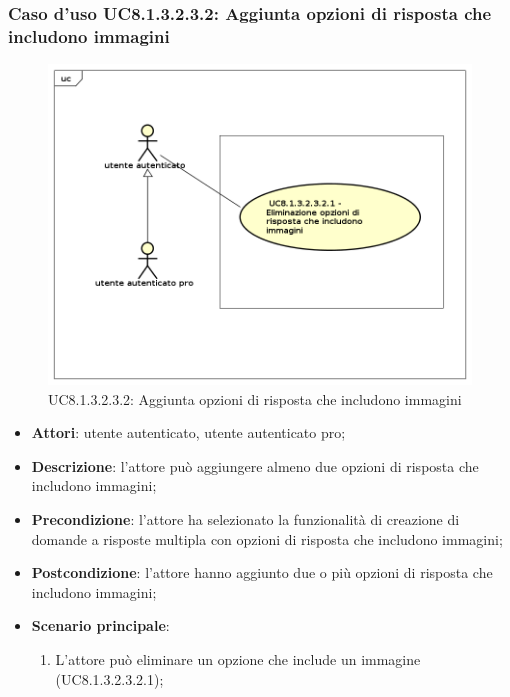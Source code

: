 \subsubsection{Caso d'uso UC8.1.3.2.3.2: Aggiunta opzioni di risposta che includono immagini}
	\label{UC8.1.3.2.3.2}
	\begin{figure}[h]
		\centering
			\includegraphics[scale=0.45,keepaspectratio]{UML/UC8_1_3_2_3_2.png}
		\caption{UC8.1.3.2.3.2:  Aggiunta opzioni di risposta che includono immagini}
	\end{figure}	
	\FloatBarrier
	\begin{itemize}
		\item
			\textbf{Attori}: utente autenticato, utente autenticato pro;
		\item		
			\textbf{Descrizione}: l'attore può aggiungere almeno due opzioni di risposta che includono immagini;
		\item
			\textbf{Precondizione}: l'attore ha selezionato la funzionalità di creazione di domande a risposte multipla con opzioni di risposta che includono immagini; 
		\item
			\textbf{Postcondizione}: l'attore hanno aggiunto due o più opzioni di risposta che includono immagini;
		\item
			\textbf{Scenario principale}: 
				\begin{enumerate}
					\item
						L'attore può eliminare un opzione che include un immagine (UC8.1.3.2.3.2.1); 				
				\end{enumerate}
	\end{itemize}
	
